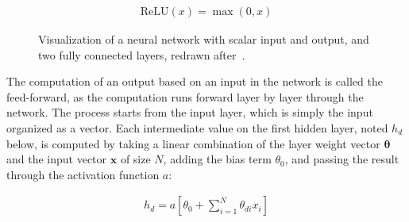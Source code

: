 \documentclass{article}
\begin{document}
\begin{align}
    \text{ReLU}(x) = \max(0, x)
    \label{eq:relu}
\end{align}

\begin{figure}[h]
    \centering
\caption{Visualization of a neural network with scalar input and output, and two fully connected layers, redrawn after~\cite{princebook}.}
\label{image:neuralnet}
\end{figure}


The computation of an output based on an input in the network is called the 
feed-forward, as the computation runs forward layer by layer through the 
network. The process starts from the input layer, which is simply the input 
organized as a vector. Each intermediate value on the first hidden layer, noted $h_d$ below,
is computed by taking a linear combination of the layer weight vector $\mathbf{\theta}$ and 
the input vector $\mathbf{x}$ of size $N$, adding the 
bias term $\theta_0$, and passing the result through the activation function $a$:

\begin{align}
    h_d = a\left[ \theta_{0} + \sum_{i=1}^{N}\theta_{di}x_{i} \right]
\label{eq:fc_layer}
\end{align}
\end{document}
